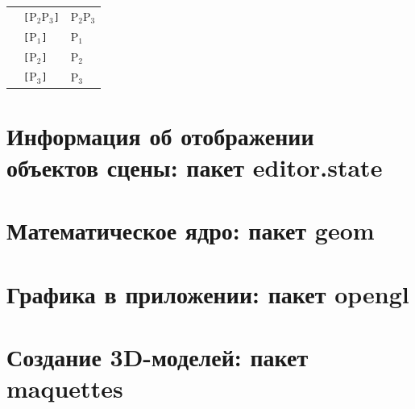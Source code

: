\documentclass[fontsize=10px, a4paper, openany]{scrbook}
\begin{document}
\begin{enumerate}
\begin{table}[h!]
\begin{tabular}{lll}
 & \cellcolor[HTML]{68CBD0}\texttt{[$\text{P}_2\text{P}_3$]} & \cellcolor[HTML]{68CBD0}\texttt{$\text{P}_2\text{P}_3$} \\
 & \cellcolor[HTML]{68CBD0}\texttt{[$\text{P}_1$]} & \cellcolor[HTML]{68CBD0}\texttt{$\text{P}_1$} \\
 & \cellcolor[HTML]{68CBD0}\texttt{[$\text{P}_2$]} & \cellcolor[HTML]{68CBD0}\texttt{$\text{P}_2$} \\
 & \cellcolor[HTML]{68CBD0}\texttt{[$\text{P}_3$]} & \cellcolor[HTML]{68CBD0}\texttt{$\text{P}_3$} \\
\end{tabular}
\end{table}

\begin{center}
\end{center}

\end{enumerate}

\chapter{Информация об отображении объектов сцены: пакет \textbf{editor.state}}

\chapter{Математическое ядро: пакет \textbf{geom}}

\chapter{Графика в приложении: пакет \textbf{opengl}}

\chapter{Создание 3D-моделей: пакет \textbf{maquettes}}
\end{document}
